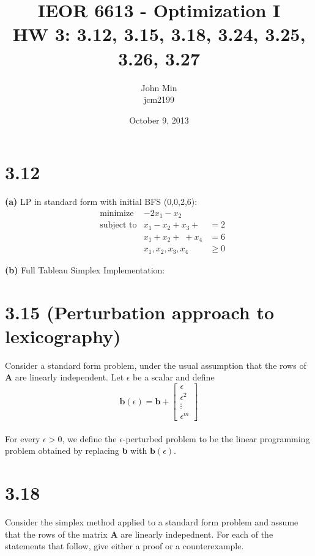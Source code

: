 \documentclass{article}
\begin{document}
\title{IEOR 6613 - Optimization I\\ HW 3:  3.12, 3.15, 3.18, 3.24, 3.25, 3.26, 3.27}

\author{John Min\\ jcm2199}
\date{October 9, 2013}
\maketitle
\pagebreak

\section{3.12}
\textbf{(a)} LP in standard form with initial BFS (0,0,2,6):\\
\begin{equation*}
\begin{aligned}
& \text{minimize} & -2x_1 - x_2 &\\
& \text{subject to} &  x_1 - x_2 +x_3 + \; & = 2 \\
& 			&         x_1 + x_2 + \; + x_4 & = 6 \\
& 			&	x_1, x_2, x_3, x_4 & \geq 0
\end{aligned}
\end{equation*}

\noindent
\textbf{(b)} Full Tableau Simplex Implementation:\\


\section*{3.15 (Perturbation approach to lexicography)}
Consider a standard form problem, under the usual assumption that the rows of \textbf{A} are linearly independent.  Let $\epsilon$ be a scalar and define 
\begin{equation*}
\mathbf{b}(\epsilon) = \mathbf{b} + 
     \begin{bmatrix}
      \epsilon \\
      \epsilon^2\\
       \vdots \\
       \epsilon^m 
	\end{bmatrix}
\end{equation*} \\

\noindent 
For every $\epsilon > 0$, we define the $\epsilon$-perturbed problem to be the linear programming problem obtained by replacing \textbf{b} with $\mathbf{b}(\epsilon)$.


\section*{3.18} Consider the simplex method applied to a standard form problem and assume that the rows of the matrix \textbf{A} are linearly indepednent.  For each of the statements that follow, give either a proof or a counterexample.\\
\end{document}
